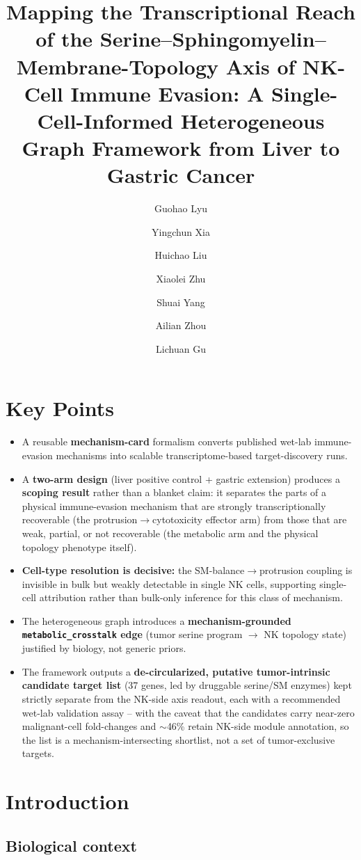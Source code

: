 \documentclass[modern,large,numbered,nocrop]{oup-authoring-template}
\title[Transcriptional reach of the NK serine--SM--topology axis]{Mapping the Transcriptional Reach of the Serine--Sphingomyelin--Membrane-Topology Axis of NK-Cell Immune Evasion: A Single-Cell-Informed Heterogeneous Graph Framework from Liver to Gastric Cancer}
\author[1,2]{Guohao Lyu}
\author[1,2]{Yingchun Xia}
\author[1,2]{Huichao Liu}
\author[1,2]{Xiaolei Zhu}
\author[1,2]{Shuai Yang}
\author[3,4,*]{Ailian Zhou}
\author[1,2,*]{Lichuan Gu}
\begin{document}
\maketitle

\section*{Key Points}
\begin{itemize}
\item A reusable \textbf{mechanism-card} formalism converts published wet-lab immune-evasion mechanisms into scalable transcriptome-based target-discovery runs.
\item A \textbf{two-arm design} (liver positive control + gastric extension) produces a \textbf{scoping result} rather than a blanket claim: it separates the parts of a physical immune-evasion mechanism that are strongly transcriptionally recoverable (the protrusion$\to$cytotoxicity effector arm) from those that are weak, partial, or not recoverable (the metabolic arm and the physical topology phenotype itself).
\item \textbf{Cell-type resolution is decisive:} the SM-balance$\to$protrusion coupling is invisible in bulk but weakly detectable in single NK cells, supporting single-cell attribution rather than bulk-only inference for this class of mechanism.
\item The heterogeneous graph introduces a \textbf{mechanism-grounded \texttt{metabolic\_crosstalk} edge} (tumor serine program $\to$ NK topology state) justified by biology, not generic priors.
\item The framework outputs a \textbf{de-circularized, putative tumor-intrinsic candidate target list} (37 genes, led by druggable serine/SM enzymes) kept strictly separate from the NK-side axis readout, each with a recommended wet-lab validation assay -- with the caveat that the candidates carry near-zero malignant-cell fold-changes and $\sim$46\% retain NK-side module annotation, so the list is a mechanism-intersecting shortlist, not a set of tumor-exclusive targets.
\end{itemize}

\section{Introduction}

\subsection{Biological context}
\end{document}
